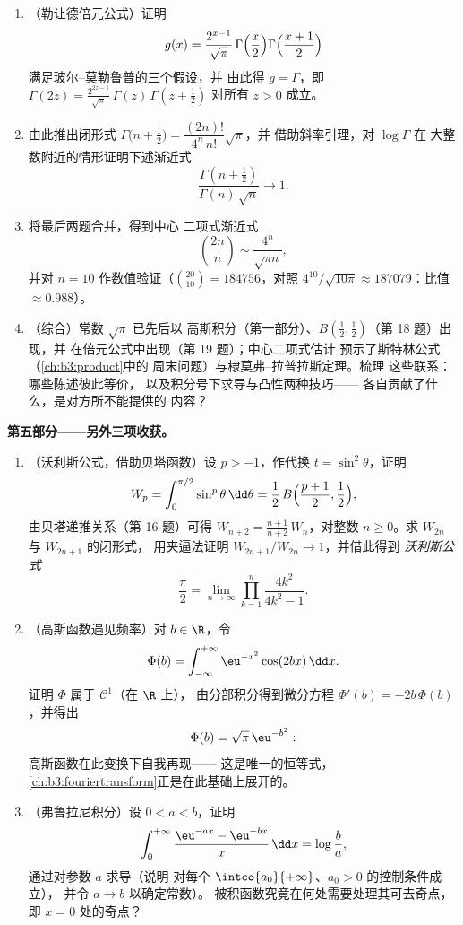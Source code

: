 \begin{problem}
\begin{enumerate}[resume]
  \item （勒让德倍元公式）证明
        \[
        g(x) = \frac{2^{x-1}}{\sqrt\pi}\,
        \Gamma\Bigl(\frac x2\Bigr)
        \Gamma\Bigl(\frac{x+1}2\Bigr)
        \]
        满足玻尔--莫勒鲁普的三个假设，并
        由此得 $g = \Gamma$，即 $\Gamma(2z) =
        \frac{2^{2z-1}}{\sqrt\pi}\,\Gamma(z)\,\Gamma(z +
        \tfrac12)$ 对所有 $z > 0$ 成立。
  \item 由此推出闭形式 $\Gamma\bigl(n + \tfrac12\bigr)
        = \dfrac{(2n)!}{4^n\,n!}\sqrt\pi$，并
        借助斜率引理，对 $\log\Gamma$ 在
        大整数附近的情形证明下述渐近式
        \[
        \frac{\Gamma(n + \frac12)}{\Gamma(n)\,\sqrt n}
        \longrightarrow 1 .
        \]
  \item 将最后两题合并，得到中心
        二项式渐近式
        \[
        \binom{2n}{n} \sim \frac{4^n}{\sqrt{\pi n}},
        \]
        并对 $n = 10$ 作数值验证（$\binom{20}{10} =
        184756$，对照 $4^{10}/\sqrt{10\pi} \approx
        187079$：比值 $\approx 0.988$）。
  \item （综合）常数 $\sqrt\pi$ 已先后以
        高斯积分（第一部分）、$B(\frac12,
        \frac12)$（第 18 题）出现，并
        在倍元公式中出现（第 19 题）；中心二项式估计
        预示了斯特林公式（\cref{ch:b3:product}中的
        周末问题）与棣莫弗--拉普拉斯定理。梳理
        这些联系：哪些陈述彼此等价，
        以及积分号下求导与凸性两种技巧——
        各自贡献了什么，是对方所不能提供的
        内容？
\end{enumerate}

\medskip
\noindent\textbf{第五部分——另外三项收获。}
\begin{enumerate}[resume]
  \item （沃利斯公式，借助贝塔函数）设 $p > -1$，作代换 $t =
        \sin^2\theta$，证明
        \[
        W_p = \int_0^{\pi/2}\sin^p\theta\,\dd\theta
        = \frac12\,B\Bigl(\frac{p+1}2, \frac12\Bigr),
        \]
        由贝塔递推关系（第 16 题）可得
        $W_{n+2} = \frac{n+1}{n+2}\,W_n$，对整数 $n \geq
        0$。求 $W_{2n}$ 与 $W_{2n+1}$ 的闭形式，
        用夹逼法证明 $W_{2n+1}/W_{2n} \to 1$，并借此得到
        \emph{沃利斯公式}
        \[
        \frac\pi2 = \lim_{n\to\infty}
        \prod_{k=1}^{n}\frac{4k^2}{4k^2 - 1} .
        \]
  \item （高斯函数遇见频率）对 $b \in \R$，令
        \[
        \Phi(b) = \int_{-\infty}^{+\infty}
        \eu^{-x^2}\cos(2bx)\,\dd x .
        \]
        证明 $\Phi$ 属于 $\mathcal C^1$（在 $\R$ 上），
        由分部积分得到微分方程
        $\Phi'(b) = -2b\,\Phi(b)$，并得出
        \[
        \Phi(b) = \sqrt\pi\,\eu^{-b^2} :
        \]
        高斯函数在此变换下自我再现——
        这是唯一的恒等式，
        \cref{ch:b3:fouriertransform}正是在此基础上展开的。
  \item （弗鲁拉尼积分）设 $0 < a < b$，证明
        \[
        \int_0^{+\infty}
        \frac{\eu^{-ax} - \eu^{-bx}}{x}\,\dd x
        = \log\frac ba ,
        \]
        通过对参数 $a$ 求导（说明
        对每个 $\intco{a_0}{+\infty}$、$a_0 > 0$ 的控制条件成立），
        并令 $a \to b$ 以确定常数）。
        被积函数究竟在何处需要处理其可去奇点，
        即 $x = 0$ 处的奇点？
\end{enumerate}
\end{problem}
